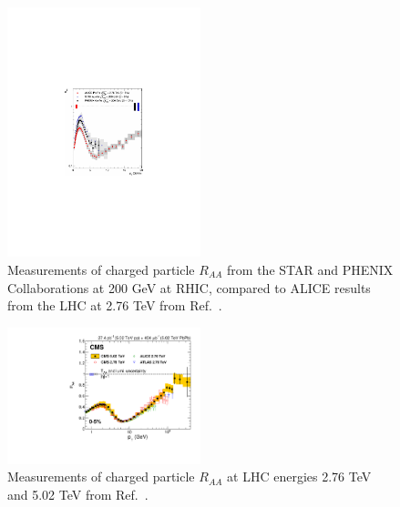 \begin{figure}[h!]
\begin{center}
\includegraphics[width=0.5\textwidth]{figures/Theory/ChPart_Raa_ALICE_RHIC.pdf}
\caption[Charged particle $R_{AA}$ at 200 GeV and 2.76 TeV]{Measurements of charged particle $R_{AA}$ from the STAR and PHENIX Collaborations at 200 GeV at RHIC, compared to ALICE results from the LHC at 2.76 TeV from Ref.~\cite{Aamodt:2010jd}.}
\label{fig:alice_chpart_raa}
\end{center}
\end{figure}

\begin{figure}[ht!]
\begin{center}
\includegraphics[width=0.5\textwidth]{figures/Theory/ChPart_Raa_CMS_LHC.pdf}
\caption[Charged particle $R_{AA}$ at 2.76 and 5.02 TeV]{Measurements of charged particle $R_{AA}$ at LHC energies 2.76 TeV and 5.02 TeV from Ref.~\cite{Khachatryan:2016odn}.}
\label{fig:cms_chpart_raa}
\end{center}
\end{figure}


